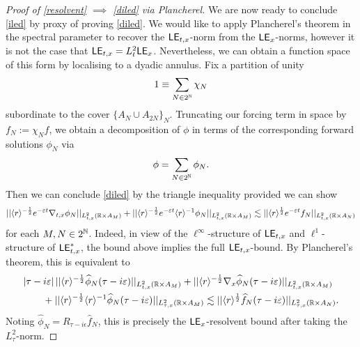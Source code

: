 \begin{proof}[Proof of \eqref{resolvent} $\implies$ \eqref{diled} via Plancherel]
	We are now ready to conclude \eqref{iled} by proxy of proving \eqref{diled}. We would like to apply Plancherel's theorem in the spectral parameter to recover the $\mathsf{LE}_{t, x}$-norm from the $\mathsf{LE}_x$-norms, however it is not the case that $\mathsf{LE}_{t, x} = L^2_t \mathsf{LE}_x$. Nevertheless, we can obtain a function space of this form by localising to a dyadic annulus. Fix a partition of unity
		\[
			1 \equiv \sum_{N \in 2^\mathbb N} \chi_N
		\]
	subordinate to the cover $\{A_N \cup A_{2N}\}_N$. 	Truncating our forcing term in space by $f_N := \chi_N f$, we obtain a decomposition of $\phi$ in terms of the corresponding forward solutions $\phi_N$ via
		\[
			\phi = \sum_{N \in 2^\mathbb N} \phi_N.
		\]
	Then we can conclude \eqref{diled} by the triangle inequality provided we can show
		\[
			|| \langle r \rangle^{-\frac12} e^{-\varepsilon t} \nabla_{t, x} \phi_N||_{L^2_{t, x} (\mathbb R \times A_M)} + || \langle r \rangle^{-\frac12} e^{-\varepsilon t} \langle r \rangle^{-1} \phi_N||_{L^2_{t, x} (\mathbb R \times A_M)} \lesssim || \langle r\rangle^{\frac12} e^{-\varepsilon t} f_N||_{L^2_{t, x} (\mathbb R \times A_N)}
		\]
	for each $M, N \in 2^\mathbb N$. Indeed, in view of the $\ell^\infty$-structure of $\mathsf{LE}_{t, x}$ and $\ell^1$-structure of $\mathsf{LE}^*_{t, x}$, the bound above implies the full $\mathsf{LE}_{t, x}$-bound. By Plancherel's theorem, this is equivalent to 
		\begin{align*}
			&|\tau - i \varepsilon| \, || \langle r \rangle^{-\frac12} \widehat \phi_N (\tau - i \varepsilon)||_{L^2_{t, x} (\mathbb R \times A_M)} + || \langle r \rangle^{-\frac12} \nabla_x \widehat \phi_N (\tau - i \varepsilon)||_{L^2_{t, x} (\mathbb R \times A_M)} \\
				&\qquad+ || \langle r \rangle^{-\frac12} \langle r \rangle^{-1} \widehat\phi_N (\tau - i \varepsilon)||_{L^2_{\tau, x} (\mathbb R \times A_M)} \lesssim || \langle r\rangle^{\frac12} \widehat f_N (\tau - i \varepsilon)||_{L^2_{\tau, x} (\mathbb R \times A_N)}.
		\end{align*}
	Noting $\widehat \phi_N = R_{\tau - i \epsilon} \widehat f_N$, this is precisely the $\mathsf{LE}_x$-resolvent bound after taking the $L^2_\tau$-norm. 
\end{proof}
